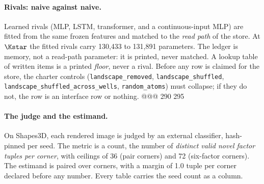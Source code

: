 \paragraph{Rivals: naive against naive.} Learned rivals (MLP, LSTM, transformer, and a
continuous-input MLP) are fitted from the same frozen features and matched to the
\emph{read path} of the store. At $\Kstar$ the fitted rivals carry 130,433 to 131,891 parameters.
The ledger is memory, not a read-path parameter: it is printed, never matched. A lookup table
of written items is a printed \emph{floor}, never a rival. Before any row is claimed for the
store, the charter controls (\texttt{landscape\_removed}, \texttt{landscape\_shuffled},
\texttt{landscape\_shuffled\_across\_wells}, \texttt{random\_atoms}) must collapse; if they do
not, the row is an interface row or nothing.
@@@ 290 295
\paragraph{The judge and the estimand.} On Shapes3D, each rendered image is judged by an
external classifier, hash-pinned per seed. The metric is a count, the number of \emph{distinct
valid novel factor tuples per corner}, with ceilings of 36 (pair corners) and 72 (six-factor
corners). The estimand is paired over corners, with a margin of 1.0 tuple per corner declared
before any number. %
Every table carries the seed count as a column.
